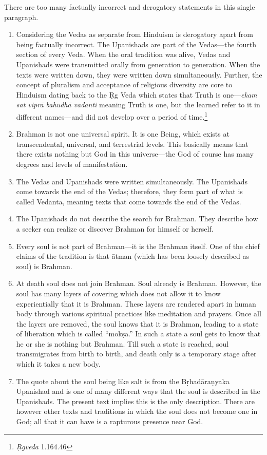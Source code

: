 There are too many factually incorrect and derogatory statements in this single paragraph.
\begin{enumerate}
\itemsep=1pt
\item 
  Considering the Vedas as separate from Hinduism is derogatory apart from being factually incorrect. The Upanishads are part of the Vedas—the fourth section of every Veda. When the oral tradition was alive, Vedas and Upanishads were transmitted orally from generation to generation. When the texts were written down, they were written down simultaneously. Further, the concept of pluralism and acceptance of religious diversity are core to Hinduism dating back to the Ṛg Veda which states that Truth is one—\textit{ekam sat viprā bahudhā vadanti} meaning Truth is one, but the learned refer to it in different names—and did not develop over a period of time.\footnote{\textit{Ṛgveda} 1.164.46}
\item 
Brahman is not one universal spirit. It is one Being, which exists at transcendental, universal, and terrestrial levels. This basically means that there exists nothing but God in this universe—the God of course has many degrees and levels of manifestation. 
\item 
The Vedas and Upanishads were written simultaneously. The Upanishads come towards the end of the Vedas; therefore, they form part of what is called Vedānta, meaning texts that come towards the end of the Vedas. 
\item 
The Upanishads do not describe the search for Brahman. They describe how a seeker can realize or discover Brahman for himself or herself. 
\item 
Every soul is not part of Brahman—it is the Brahman itself. One of the chief claims of the tradition is that ātman (which has been loosely described as soul) is Brahman. 
\item 
At death soul does not join Brahman. Soul already is Brahman. However, the soul has many layers of covering which does not allow it to know experientially that it is Brahman. These layers are rendered apart in human body through various spiritual practices like meditation and prayers. Once all the layers are removed, the soul knows that it is Brahman, leading to a state of liberation which is called “mokṣa.” In such a state a soul gets to know that he or she is nothing but Brahman. Till such a state is reached, soul transmigrates from birth to birth, and death only is a temporary stage after which it takes a new body.
\item 
The quote about the soul being like salt is from the Bṛhadāraṇyaka Upanishad and is one of many different ways that the soul is described in the Upanishads. The present text implies this is the only description. There are however other texts and traditions in which the soul does not become one in God; all that it can have is a rapturous presence near God.

\end{enumerate}
